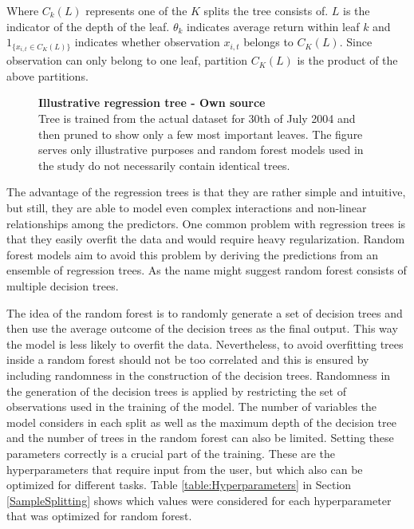 \documentclass[12pt]{article}
\begin{document}
Where $C_k(L)$ represents one of the $K$ splits the tree consists of. $L$ is the indicator of the depth of the leaf. $\theta_k$ indicates average return within leaf $k$ and $1 _{\{x_{i, t} \in C_K(L)\}}$ indicates whether observation $x_{i, t}$ belongs to $C_K(L)$.\footnotemark {}  Since observation can only belong to one leaf, partition $C_K(L)$ is the product of the above partitions. \par

\begin{figure}[ht]
\centering
\caption[Illustrative regression tree]{\textbf{Illustrative regression tree \textnormal{- Own source}}\\ Tree is trained from the actual dataset for 30th of July 2004 and then pruned to show only a few most important leaves. The figure serves only illustrative purposes and random forest models used in the study do not necessarily contain identical trees. }

\label{plot:regre_tree}
\end{figure}

The advantage of the regression trees is that they are rather simple and intuitive, but still, they are able to model even complex interactions and non-linear relationships among the predictors. One common problem with regression trees is that they easily overfit the data and would require heavy regularization. Random forest models aim to avoid this problem by deriving the predictions from an ensemble of regression trees. As the name might suggest random forest consists of multiple decision trees. \par

The idea of the random forest is to randomly generate a set of decision trees and then use the average outcome of the decision trees as the final output. This way the model is less likely to overfit the data. Nevertheless, to avoid overfitting trees inside a random forest should not be too correlated and this is ensured by including randomness in the construction of the decision trees. Randomness in the generation of the decision trees is applied by restricting the set of observations used in the training of the model. The number of variables the model considers in each split as well as the maximum depth of the decision tree and the number of trees in the random forest can also be limited. Setting these parameters correctly is a crucial part of the training. These are the hyperparameters that require input from the user, but which also can be optimized for different tasks. Table \ref{table:Hyperparameters} in Section \ref{SampleSplitting} shows which values were considered for each hyperparameter that was optimized for random forest. \par
\end{document}
